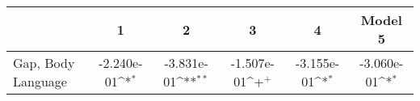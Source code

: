 {
\def\sym#1{\ifmmode^{#1}\else\(^{#1}\)\fi}
\begin{tabular}{l*{5}{c}}
    \toprule
                             & \multicolumn{1}{c}{1} & \multicolumn{1}{c}{2} & \multicolumn{1}{c}{3} & \multicolumn{1}{c}{4} & \multicolumn{1}{c}{Model 5} \\
    \midrule
    Gap, Body Language       & -2.240e-01\sym{*}     & -3.831e-01\sym{**}    & -1.507e-01\sym{+}     & -3.155e-01\sym{*}     & -3.060e-01\sym{*}           \\

\end{tabular}}
